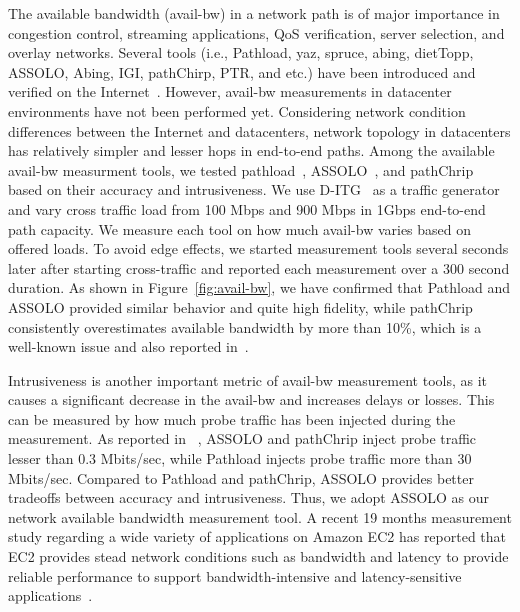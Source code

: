 The available bandwidth (avail-bw) in a network path is of major importance in
congestion control, streaming applications, QoS verification, server selection,
and overlay networks. Several tools (i.e., Pathload, yaz, spruce, abing, dietTopp,
ASSOLO, Abing, IGI, pathChirp, PTR, and etc.) have been introduced and verified
on the Internet~\cite{Goldoni:2010}. However, avail-bw measurements in datacenter environments have not been performed yet.
Considering network condition differences between the Internet and datacenters,
network topology in datacenters has relatively simpler and lesser hops in
end-to-end paths. Among the available avail-bw measurment tools, we tested
pathload~\cite{ Jain:2003}, ASSOLO~\cite{Goldoni:2009}, and pathChrip~\cite{Ribeiro:2005}
 based on their accuracy and intrusiveness.
 We use D-ITG~\cite{Botta:2012} as a traffic generator and vary cross traffic load from 100 Mbps
  and 900 Mbps in 1Gbps end-to-end path capacity. We measure each tool on
  how much avail-bw varies based on offered loads. To avoid edge effects, we started
 measurement tools several seconds later after starting cross-traffic and reported each measurement over a 300 second duration.
 As shown in Figure~\ref{fig:avail-bw}, we have confirmed that Pathload and ASSOLO
 provided similar behavior and quite high fidelity, while pathChrip consistently overestimates
 available bandwidth by more than 10\%, which is a well-known issue and also reported in~\cite{Goldoni:2010, Shriram:2005}.

Intrusiveness is another important metric of avail-bw measurement tools, as it causes a significant decrease in the avail-bw and increases delays or losses. This can be measured by how much probe traffic has been injected during the measurement. As reported in ~\cite{Goldoni:2010}, ASSOLO and pathChrip inject probe traffic lesser than 0.3 Mbits/sec, while Pathload injects probe traffic more than 30 Mbits/sec. Compared to Pathload and pathChrip, ASSOLO provides better tradeoffs between accuracy and intrusiveness. Thus, we adopt ASSOLO as our network available bandwidth measurement tool.  A recent 19 months measurement study regarding a wide variety of applications on Amazon EC2 has reported that EC2 provides stead network conditions such as bandwidth and latency to provide reliable performance to support bandwidth-intensive and latency-sensitive applications~\cite{Hajjat:2015}.




